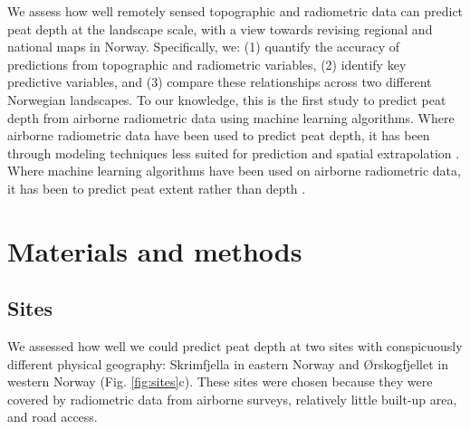 \documentclass[soil, manuscript]{copernicus}
\begin{document}
We assess how well remotely sensed topographic and radiometric data can predict peat depth at the landscape scale, with a view towards revising regional and national maps in Norway.
Specifically, we: (1) quantify the accuracy of predictions from topographic and radiometric variables, (2) identify key predictive variables, and (3) compare these relationships across two different Norwegian landscapes.
To our knowledge, this is the first study to predict peat depth from airborne radiometric data using machine learning algorithms.
Where airborne radiometric data have been used to predict peat depth, it has been through modeling techniques less suited for prediction and spatial extrapolation \citep[e.g.,][]{keaneySpatialStatisticsEstimate2013, gatisMappingUplandPeat2019, siemonAirborneElectromagneticRadiometric2020}.
Where machine learning algorithms have been used on airborne radiometric data, it has been to predict peat extent rather than depth \citep[e.g.,][]{olearyDigitalSoilMapping2022}.

\section{Materials and methods}

\subsection{Sites}

We assessed how well we could predict peat depth at two sites with conspicuously different physical geography: Skrimfjella in eastern Norway and Ørskogfjellet in western Norway (Fig. \ref{fig:sites}c).
These sites were chosen because they were covered by radiometric data from airborne surveys, relatively little built-up area, and road access.
\end{document}
